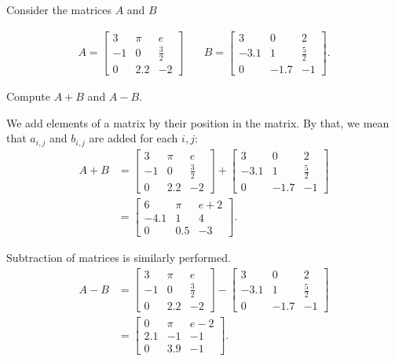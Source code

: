 {Consider the matrices $A$ and $B$

\begin{align}  
A= 
\begin{bmatrix}
	3 & \pi & e \\
	-1 &0 & \frac{3}{2}\\
	0 & 2.2 & -2
\end{bmatrix}
&
\quad B=
\begin{bmatrix}
	3 & 0 & 2 \\
	-3.1 & 1 & \frac{5}{2}\\
	0 & -1.7 & -1	
\end{bmatrix}.
\end{align}

Compute $A+B$ and $A-B$.
}
{
We add elements of a matrix by their position in the matrix.  By that, we mean that $a_{i,j}$ and $b_{i,j}$ are added for each $i,j$:
\begin{align}  
A+B &=  
\begin{bmatrix}
	3 & \pi & e \\
	-1 &0 & \frac{3}{2}\\
	0 & 2.2 & -2
\end{bmatrix}
+ 
\begin{bmatrix}
	3 & 0 & 2 \\
	-3.1 & 1 & \frac{5}{2}\\
	0 & -1.7 & -1	
\end{bmatrix}\\
&= \begin{bmatrix}
	6 & \pi &e + 2 \\
	-4.1 & 1 & 4 \\
	0 & 0.5 & -3
\end{bmatrix}.
\end{align}

Subtraction of matrices is similarly performed.  
\begin{align}  
A-B &=  
\begin{bmatrix}
	3 & \pi & e \\
	-1 &0 & \frac{3}{2}\\
	0 & 2.2 & -2
\end{bmatrix}
-
\begin{bmatrix}
	3 & 0 & 2 \\
	-3.1 & 1 & \frac{5}{2}\\
	0 & -1.7 & -1	
\end{bmatrix}\\
&= \begin{bmatrix}
	0 & \pi &e - 2 \\
	2.1 & -1 & -1 \\
	0 & 3.9 & -1
\end{bmatrix}.
\end{align}
}\\


